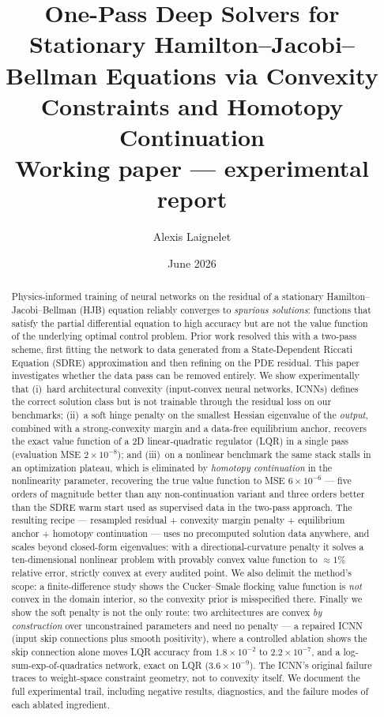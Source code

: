 \documentclass[11pt,a4paper]{article}
\title{One-Pass Deep Solvers for Stationary Hamilton--Jacobi--Bellman
Equations via Convexity Constraints and Homotopy Continuation\\[1ex]
\large Working paper --- experimental report}
\author{Alexis Laignelet}
\date{June 2026}
\begin{document}
\maketitle

\begin{abstract}
Physics-informed training of neural networks on the residual of a stationary
Hamilton--Jacobi--Bellman (HJB) equation reliably converges to
\emph{spurious solutions}: functions that satisfy the partial differential
equation to high accuracy but are not the value function of the underlying
optimal control problem. Prior work resolved this with a two-pass scheme,
first fitting the network to data generated from a State-Dependent Riccati
Equation (SDRE) approximation and then refining on the PDE residual. This
paper investigates whether the data pass can be removed entirely. We show
experimentally that (i)~hard architectural convexity (input-convex neural
networks, ICNNs) defines the correct solution class but is not trainable
through the residual loss on our benchmarks; (ii)~a soft hinge penalty on the
smallest Hessian eigenvalue of the \emph{output}, combined with a
strong-convexity margin and a data-free equilibrium anchor, recovers the
exact value function of a 2D linear-quadratic regulator (LQR) in a single
pass (evaluation MSE $2\times10^{-8}$); and (iii)~on a nonlinear benchmark
the same stack stalls in an optimization plateau, which is eliminated by
\emph{homotopy continuation} in the nonlinearity parameter, recovering the
true value function to MSE $6\times10^{-6}$ --- five orders of magnitude
better than any non-continuation variant and three orders better than the
SDRE warm start used as supervised data in the two-pass approach. The
resulting recipe --- resampled residual + convexity margin penalty +
equilibrium anchor + homotopy continuation --- uses no precomputed solution
data anywhere, and scales beyond closed-form eigenvalues: with a
directional-curvature penalty it solves a ten-dimensional nonlinear problem
with provably convex value function to $\approx 1\%$ relative error,
strictly convex at every audited point. We also delimit the method's scope:
a finite-difference study shows the Cucker--Smale flocking value function is
\emph{not} convex in the domain interior, so the convexity prior is
misspecified there. Finally we show the soft penalty is not the only
route: two architectures are convex \emph{by construction} over unconstrained
parameters and need no penalty --- a repaired ICNN (input skip connections
plus smooth positivity), where a controlled ablation shows the skip
connection alone moves LQR accuracy from $1.8\times10^{-2}$ to
$2.2\times10^{-7}$, and a log-sum-exp-of-quadratics network, exact on LQR
($3.6\times10^{-9}$). The ICNN's original failure traces to weight-space
constraint geometry, not to convexity itself. We document the full
experimental trail, including negative results, diagnostics, and the failure
modes of each ablated ingredient.
\end{abstract}
\end{document}
